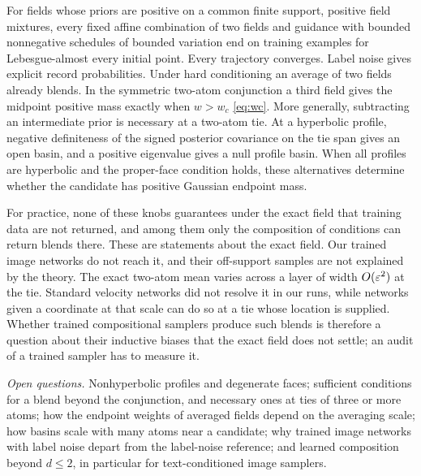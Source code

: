 \documentclass{article} %
\theoremstyle{plain}
\theoremstyle{definition}
\theoremstyle{remark}
\begin{document}
For fields whose priors are positive on a common finite support, positive field mixtures,
every fixed affine combination of two fields and guidance with bounded nonnegative schedules of
bounded variation end on training examples for Lebesgue-almost every initial point. Every
trajectory converges. Label noise gives explicit record probabilities. Under hard conditioning an average
of two fields already blends. In the symmetric two-atom
conjunction a third field gives the midpoint positive mass exactly when $w>w_c$ \eqref{eq:wc}. More
generally, subtracting an intermediate prior is necessary at a two-atom tie. At a hyperbolic
profile, negative definiteness of the signed posterior covariance on the tie span gives an open
basin, and a positive eigenvalue gives a null profile basin. When all profiles are hyperbolic and
the proper-face condition holds, these alternatives determine whether the candidate has positive
Gaussian endpoint mass.

For practice, none of these knobs guarantees under the exact field that training data are not
returned, and among them only the composition of conditions can return blends there. These are
statements about the exact field. Our trained image networks do not reach it, and their off-support
samples are not explained by the theory. The exact two-atom mean varies across a layer of width
$O(\varepsilon^2)$ at the tie. Standard velocity networks did not resolve it in our runs, while networks
given a coordinate at that scale can do so at a tie whose location is supplied. Whether trained
compositional samplers produce such blends is therefore a question about their inductive biases
that the exact field does not settle; an audit of a trained sampler has to measure it.

\emph{Open questions.} Nonhyperbolic profiles and degenerate faces; sufficient conditions for a
blend beyond the conjunction, and necessary ones at ties of three or more atoms; how the endpoint
weights of averaged fields depend on the averaging scale; how basins scale with many atoms near a
candidate; why trained image networks with label noise depart from the label-noise reference; and
learned composition beyond $d\le2$, in particular for text-conditioned image samplers.
\end{document}
